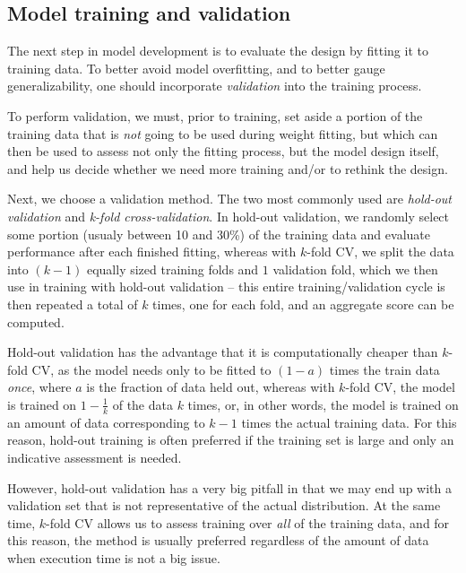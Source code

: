 \subsection{Model training and validation}

The next step in model development is to evaluate the design by fitting it to
training data. To better avoid model overfitting, and to better gauge
generalizability, one should incorporate \emph{validation} into the training
process.

To perform validation, we must, prior to training, set aside a portion of the
training data that is \emph{not} going to be used during weight fitting,
but which can then be used to assess not only the fitting process, but the model
design itself, and help us decide whether we need more training and/or to
rethink the design.

Next, we choose a validation method. The two most commonly used are
\emph{hold-out validation} and \emph{k-fold cross-validation}. In hold-out
validation, we randomly select some portion (usualy between 10 and 30\%) of the
training data and evaluate performance after each finished fitting, whereas with
$k$-fold CV, we split the data into $(k - 1)$ equally sized training folds and
$1$ validation fold, which we then use in training with hold-out validation --
this entire training/validation cycle is then repeated a total of $k$ times, one
for each fold, and an aggregate score can be computed.

Hold-out validation has the advantage that it is computationally cheaper than
$k$-fold CV, as the model needs only to be fitted to $(1 - a)$ times the train
data \emph{once}, where $a$ is the fraction of data held out, whereas with
$k$-fold CV, the model is trained on $1 - \frac{1}{k}$ of the data $k$ times,
or, in other words, the model is trained on an amount of data corresponding to
$k - 1$ times the actual training data. For this reason, hold-out training is
often preferred if the training set is large and only an indicative assessment
is needed.

However, hold-out validation has a very big pitfall in that we may end up with a
validation set that is not representative of the actual distribution. At the
same time, $k$-fold CV allows us to assess training over \emph{all} of the
training data, and for this reason, the method is usually preferred regardless
of the amount of data when execution time is not a big issue.

